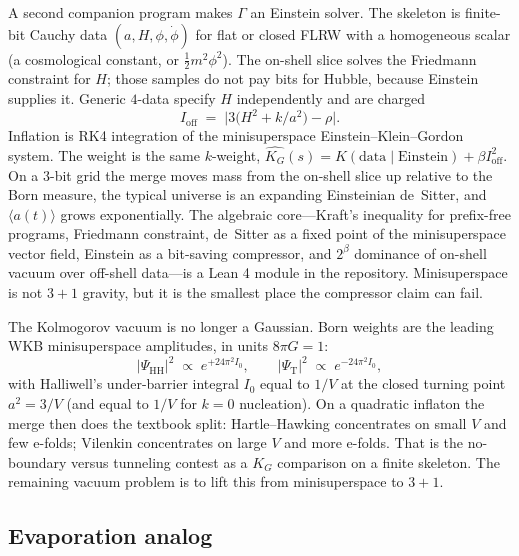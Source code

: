 \documentclass[11pt,a4paper]{article}
\theoremstyle{plain}
\theoremstyle{definition}
\theoremstyle{remark}
\newcommand{\KG}{K_{G}}
\begin{document}
A second companion program makes $\Gamma$ an Einstein solver.
The skeleton is finite-bit Cauchy data $(a,H,\phi,\dot\phi)$ for flat or closed FLRW with a homogeneous scalar (a cosmological constant, or $\tfrac12 m^{2}\phi^{2}$).
The on-shell slice solves the Friedmann constraint for $H$; those samples do not pay bits for Hubble, because Einstein supplies it.
Generic $4$-data specify $H$ independently and are charged
\begin{equation}
  I_{\mathrm{off}} \;=\; \bigl|3\bigl(H^{2}+k/a^{2}\bigr)-\rho\bigr|.
\end{equation}
Inflation is RK4 integration of the minisuperspace Einstein--Klein--Gordon system.
The weight is the same $k$-weight,
$\widehat{\KG}(s)=K(\mathrm{data}\mid\mathrm{Einstein})+\beta I_{\mathrm{off}}^{2}$.
On a $3$-bit grid the merge moves mass from the on-shell slice up relative to the Born measure, the typical universe is an expanding Einsteinian de~Sitter, and $\langle a(t)\rangle$ grows exponentially.
The algebraic core---Kraft's inequality for prefix-free programs, Friedmann constraint, de~Sitter as a fixed point of the minisuperspace vector field, Einstein as a bit-saving compressor, and $2^{\beta}$ dominance of on-shell vacuum over off-shell data---is a Lean 4 module in the repository.
Minisuperspace is not $3{+}1$ gravity, but it is the smallest place the compressor claim can fail.

The Kolmogorov vacuum is no longer a Gaussian. Born weights are the leading WKB minisuperspace amplitudes, in units $8\pi G=1$:
\begin{equation}
  |\Psi_{\mathrm{HH}}|^{2} \;\propto\; e^{+24\pi^{2} I_{0}}, \qquad
  |\Psi_{\mathrm{T}}|^{2} \;\propto\; e^{-24\pi^{2} I_{0}},
\end{equation}
with Halliwell's under-barrier integral $I_{0}$ equal to $1/V$ at the closed turning point $a^{2}=3/V$ (and equal to $1/V$ for $k=0$ nucleation).
On a quadratic inflaton the merge then does the textbook split: Hartle--Hawking concentrates on small $V$ and few e-folds; Vilenkin concentrates on large $V$ and more e-folds.
That is the no-boundary versus tunneling contest as a $\KG$ comparison on a finite skeleton. The remaining vacuum problem is to lift this from minisuperspace to $3{+}1$.

\subsection{Evaporation analog}
\end{document}
